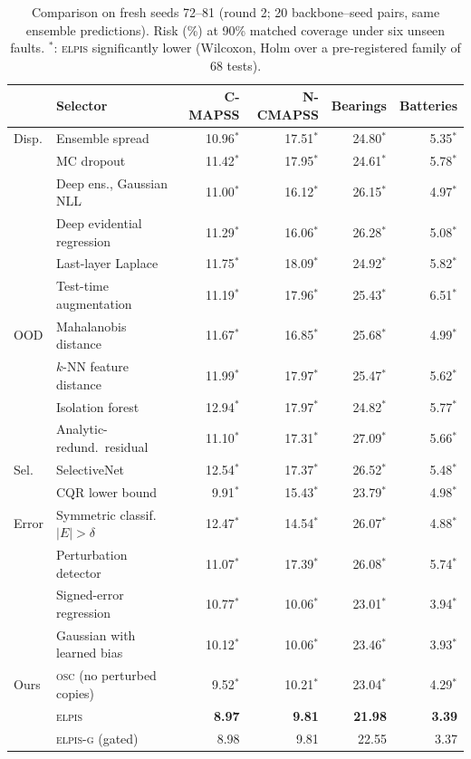 \documentclass{esannV2}
\newcommand{\OSC}{\textsc{osc}}
\newcommand{\RPT}{\textsc{elpis}}
\newcommand{\AUTOD}{\textsc{elpis-g}}
\newcommand{\s}{$^{\ast}$}
\begin{document}
\begin{table}[t]
\centering\scriptsize
\setlength{\tabcolsep}{3.5pt}
\begin{tabular*}{\textwidth}{@{}ll@{\extracolsep{\fill}}rrrr@{}}
\toprule
 & Selector & C-MAPSS & N-CMAPSS & Bearings & Batteries\\
\midrule
Disp. & Ensemble spread~\cite{lakshminarayanan2017simple} & 10.96\s & 17.51\s & 24.80\s & 5.35\s\\
 & MC dropout~\cite{gal2016dropout} & 11.42\s & 17.95\s & 24.61\s & 5.78\s\\
 & Deep ens., Gaussian NLL~\cite{lakshminarayanan2017simple} & 11.00\s & 16.12\s & 26.15\s & 4.97\s\\
 & Deep evidential regression~\cite{amini2020deep} & 11.29\s & 16.06\s & 26.28\s & 5.08\s\\
 & Last-layer Laplace~\cite{daxberger2021laplace} & 11.75\s & 18.09\s & 24.92\s & 5.82\s\\
 & Test-time augmentation~\cite{wang2019aleatoric} & 11.19\s & 17.96\s & 25.43\s & 6.51\s\\
OOD & Mahalanobis distance~\cite{lee2018simple} & 11.67\s & 16.85\s & 25.68\s & 4.99\s\\
 & $k$-NN feature distance~\cite{sun2022out} & 11.99\s & 17.97\s & 25.47\s & 5.62\s\\
 & Isolation forest~\cite{liu2008isolation} & 12.94\s & 17.97\s & 24.82\s & 5.77\s\\
 & Analytic-redund.\ residual~\cite{chow1984analytical} & 11.10\s & 17.31\s & 27.09\s & 5.66\s\\
Sel. & SelectiveNet~\cite{geifman2019selectivenet} & 12.54\s & 17.37\s & 26.52\s & 5.48\s\\
 & CQR lower bound~\cite{romano2019cqr} & 9.91\s & 15.43\s & 23.79\s & 4.98\s\\
Error & Symmetric classif.\ $|E|>\delta$~\cite{corbiere2019addressing,kamath2020selective} & 12.47\s & 14.54\s & 26.07\s & 4.88\s\\
 & Perturbation detector~\cite{isermann2005model} & 11.07\s & 17.39\s & 26.08\s & 5.74\s\\
 & Signed-error regression~\cite{yoo2019learning} & 10.77\s & 10.06\s & 23.01\s & 3.94\s\\
 & Gaussian with learned bias~\cite{nix1994estimating} & 10.12\s & 10.06\s & 23.46\s & 3.93\s\\
Ours & \OSC{} (no perturbed copies) & 9.52\s & 10.21\s & 23.04\s & 4.29\s\\
 & \RPT & \textbf{8.97} & \textbf{9.81} & \textbf{21.98} & \textbf{3.39}\\
 & \AUTOD{} (gated) & 8.98 & 9.81 & 22.55 & 3.37\\
\bottomrule
\end{tabular*}
\caption{Comparison on fresh seeds 72--81 (round 2; 20 backbone--seed pairs, same ensemble predictions). Risk (\%) at 90\% matched coverage under six unseen faults. \s: \RPT{} significantly lower (Wilcoxon, Holm over a pre-registered family of 68 tests).}
\label{tab:sota}
\end{table}
\end{document}
